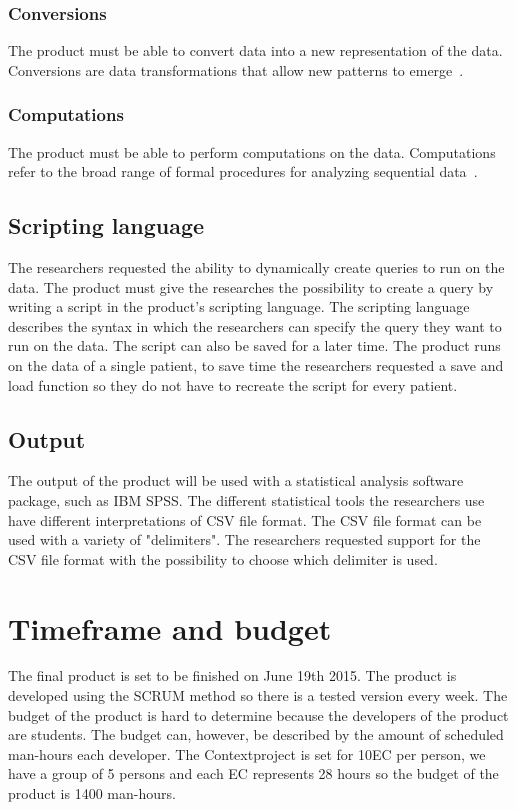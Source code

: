 \documentclass[11pt,twoside,a4paper]{article}
\begin{document}
\subsubsection{Conversions}
The product must be able to convert data into a new representation of the data. Conversions are data transformations that allow new patterns to emerge~\autocite{SeqAnalysis}.

\subsubsection{Computations}
The product must be able to perform computations on the data. Computations refer to the broad range of formal procedures for analyzing sequential data~\autocite{SeqAnalysis}.

\subsection{Scripting language}
The researchers requested the ability to dynamically create queries to run on the data. The product must give the researches the possibility to create a query by writing a script in the product's scripting language. The scripting language describes the syntax in which the researchers can specify the query they want to run on the data. The script can also be saved for a later time. The product runs on the data of a single patient, to save time the researchers requested a save and load function so they do not have to recreate the script for every patient.

\subsection{Output}
The output of the product will be used with a statistical analysis software package, such as IBM SPSS. The different statistical tools the researchers use have different interpretations of CSV file format. The CSV file format can be used with a variety of "delimiters". The researchers requested support for the CSV file format with the possibility to choose which delimiter is used.

\section{Timeframe and budget}
The final product is set to be finished on June 19th 2015. The product is developed using the SCRUM method so there is a tested version every week. The budget of the product is hard to determine because the developers of the product are students. The budget can, however, be described by the amount of scheduled man-hours each developer. The Contextproject is set for 10EC per person, we have a group of 5 persons and each EC represents 28 hours so the budget of the product is 1400 man-hours.
\end{document}

